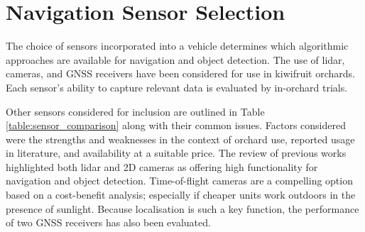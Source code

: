 \documentclass[preprint,authoryear,12pt]{elsarticle}
\begin{document}


\section{Navigation Sensor Selection}
\label{sect:sensors}
    The choice of sensors incorporated into a vehicle determines which algorithmic approaches are available for navigation and object detection.
    The use of lidar, cameras, and GNSS receivers have been considered for use in kiwifruit orchards.
    Each sensor's ability to capture relevant data is evaluated by in-orchard trials.

    Other sensors considered for inclusion are outlined in Table \ref{table:sensor_comparison} along with their common issues.
    Factors considered were the strengths and weaknesses in the context of orchard use, reported usage in literature, and availability at a suitable price.
    The review of previous works highlighted both lidar and 2D cameras as offering high functionality for navigation and object detection.
    Time-of-flight cameras are a compelling option based on a cost-benefit analysis; especially if cheaper units work outdoors in the presence of sunlight.
    Because localisation is such a key function, the performance of two GNSS receivers has also been evaluated.
\end{document}
